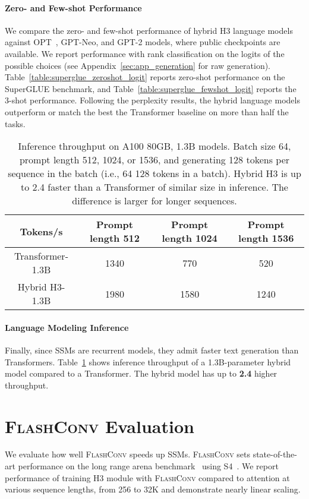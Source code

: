 \documentclass{article}
\newcommand{\fastfft}{\textsc{FlashConv}\xspace}
\newcommand{\hthree}{\textsc{H3}\xspace}
\newcommand{\num}[1]{{\color{red}\bf{#1}\normalfont}}
\newcommand{\num}[1]{#1}
\begin{document}
\paragraph{Zero- and Few-shot Performance}
We compare the zero- and few-shot performance of hybrid \hthree language models against OPT~\citep{zhang2022opt}, GPT-Neo, and GPT-2 models, where public checkpoints are available.
We report performance with rank classification on the logits of the possible choices (see Appendix~\ref{sec:app_generation} for raw generation).
Table~\ref{table:superglue_zeroshot_logit} reports zero-shot performance on the SuperGLUE benchmark, and Table~\ref{table:superglue_fewshot_logit} reports the 3-shot performance.
Following the perplexity results, the hybrid language models outperform or match the best the Transformer baseline on more than half the tasks.

\begin{table}[t]
\centering
\small
    \centering
\caption{\label{table:training_time} Inference throughput on A100 80GB, 1.3B models.
    Batch size 64, prompt length 512, 1024, or 1536, and generating 128 tokens
    per sequence in the batch (i.e., 64  128 tokens in a batch). Hybrid
    \hthree is up to 2.4 faster than a Transformer of similar size in inference. The
    difference is larger for longer sequences.}
{
        \begin{tabular}{@{}|c|c|c|c|@{}}
            \hline
Tokens/s & Prompt length 512 & Prompt length 1024 & Prompt length 1536 \\ \hline
        Transformer-1.3B & 1340 & 770 & 520 \\
Hybrid \hthree-1.3B & 1980 & 1580 & 1240 \\ \hline
        \end{tabular}
    }
%
 \end{table}
\paragraph{Language Modeling Inference}
Finally, since SSMs are recurrent models, they admit faster text generation than Transformers.
Table~\ref{table:training_time} shows inference throughput of a 1.3B-parameter hybrid model compared to a Transformer.
The hybrid model has up to \num{2.4} higher throughput.



 \section{\fastfft Evaluation \label{sec:eval_efficiency}}
We evaluate how well \fastfft speeds up SSMs.
\fastfft sets state-of-the-art performance on the long range arena benchmark~\citep{tay2020long} using S4~\citep{gu2022efficiently}.
We report performance of training \hthree module with \fastfft compared to attention at various sequence lengths, from 256 to 32K and demonstrate nearly linear scaling.
\end{document}
